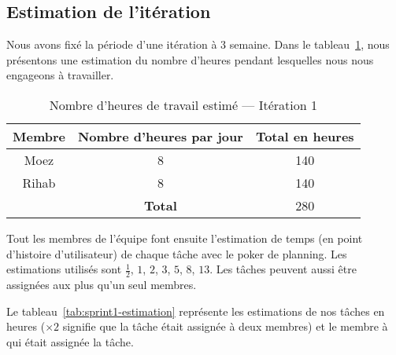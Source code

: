 \subsection{Estimation de l'itération}

Nous avons fixé la période d'une itération à 3 semaine. Dans le
tableau~\ref{tab:sprint1-capacity}, nous présentons une estimation du nombre
d'heures pendant lesquelles nous nous engageons à travailler.

\begin{table}[htbp]
    \centering
    \begin{tabular}{| c | c | c |}
        \hline
        \textbf{Membre} & \textbf{Nombre d'heures par jour} & \textbf{Total en heures} \\ \hline
        \hline

Moez & 8 & 140\\ \hline
Rihab & 8 & 140 \\ \hline
\multicolumn{1}{c|}{} & \textbf{Total} & 280 \\ \cline{2-3}
    \end{tabular}
    \caption{Nombre d'heures de travail estimé --- Itération 1}
\label{tab:sprint1-capacity}
\end{table}

Tout les membres de l'équipe font ensuite l'estimation de temps (en point
d'histoire d'utilisateur) de chaque tâche avec le poker de planning. Les
estimations utilisés sont $\frac{1}{2}$, $1$, $2$, $3$, $5$, $8$, $13$. Les
tâches peuvent aussi être assignées aux plus qu'un seul membres.

Le tableau~\ref{tab:sprint1-estimation} représente les estimations de nos
tâches en heures ($\times2$ signifie que la tâche était assignée à deux membres)
et le membre à qui était assignée la tâche.

